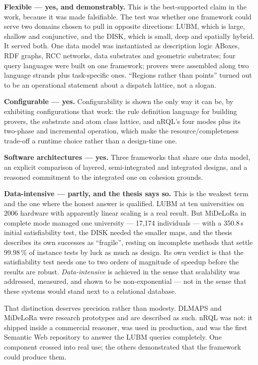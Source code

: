 \documentclass[11pt,a4paper,DIV=12,parskip=half]{scrartcl}
\begin{document}
\textbf{Flexible --- yes, and demonstrably.} This is the best-supported claim in
the work, because it was made falsifiable. The test was whether one framework
could serve two domains chosen to pull in opposite directions: LUBM, which is
large, shallow and conjunctive, and the DISK, which is small, deep and spatially
hybrid. It served both. One data model was instantiated as description logic
ABoxes, RDF graphs, RCC networks, data substrates and geometric substrates; four
query languages were built on one framework; provers were assembled along two
language strands plus task-specific ones. \enquote{Regions rather than points}
turned out to be an operational statement about a dispatch lattice, not a slogan.

\textbf{Configurable --- yes.} Configurability is shown the only way it can be,
by exhibiting configurations that work: the rule definition language for
building provers, the substrate and atom class lattice, and nRQL's four modes
plus its two-phase and incremental operation, which make the resource/completeness
trade-off a runtime choice rather than a design-time one.

\textbf{Software architectures --- yes.} Three frameworks that share one data
model, an explicit comparison of layered, semi-integrated and integrated designs,
and a reasoned commitment to the integrated one on cohesion grounds.

\textbf{Data-intensive --- partly, and the thesis says so.} This is the weakest
term and the one where the honest answer is qualified. LUBM at ten universities on
2006 hardware with apparently linear scaling is a real result. But MiDeLoRa in
complete mode managed one university --- 17,174 individuals --- with a 350.8\,s
initial satisfiability test, the DISK needed the smaller maps, and the thesis
describes its own successes as \enquote{fragile}, resting on incomplete methods
that settle 99.98\,\% of instance tests by luck as much as design. Its own verdict
is that the satisfiability test needs one to two orders of magnitude of speedup
before the results are robust. \emph{Data-intensive} is achieved in the sense that
scalability was addressed, measured, and shown to be non-exponential --- not in
the sense that these systems would stand next to a relational database.

That distinction deserves precision rather than modesty. DLMAPS and MiDeLoRa were
research prototypes and are described as such. nRQL was not: it shipped inside a
commercial reasoner, was used in production, and was the first Semantic Web
repository to answer the LUBM queries completely. One component crossed into real
use; the others demonstrated that the framework could produce them.
\end{document}
